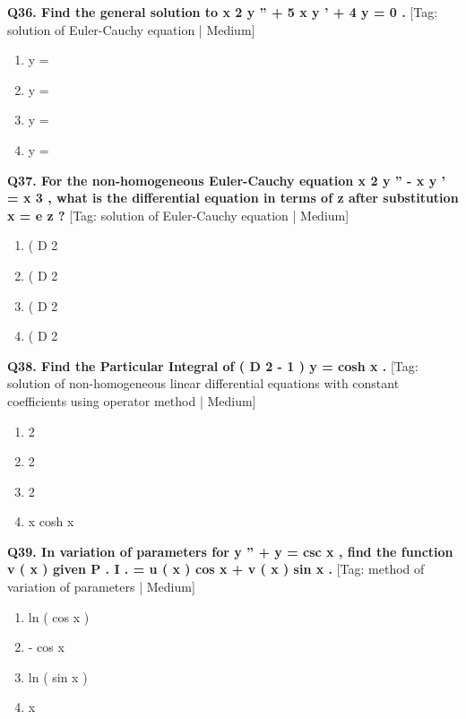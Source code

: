 \noindent\textbf{Q36. Find the general solution to x 2 y '' + 5 x y ' + 4 y = 0 .} \hfill [Tag: solution of Euler-Cauchy equation | Medium]
\begin{enumerate}[label=(\alph*),topsep=2pt,itemsep=1pt,partopsep=0pt,parsep=0pt]
    \item {{y =}}
    \item {{y =}}
    \item {{y =}}
    \item {{y =}}
\end{enumerate}
\vspace{2mm}

\noindent\textbf{Q37. For the non-homogeneous Euler-Cauchy equation x 2 y '' - x y ' = x 3 , what is the differential equation in terms of z after substitution x = e z ?} \hfill [Tag: solution of Euler-Cauchy equation | Medium]
\begin{enumerate}[label=(\alph*),topsep=2pt,itemsep=1pt,partopsep=0pt,parsep=0pt]
    \item {{( D 2}}
    \item {{( D 2}}
    \item {{( D 2}}
    \item {{( D 2}}
\end{enumerate}
\vspace{2mm}

\noindent\textbf{Q38. Find the Particular Integral of ( D 2 - 1 ) y = cosh x .} \hfill [Tag: solution of non-homogeneous linear differential equations with constant coefficients using operator method | Medium]
\begin{enumerate}[label=(\alph*),topsep=2pt,itemsep=1pt,partopsep=0pt,parsep=0pt]
    \item {{2}}
    \item {{2}}
    \item {{2}}
    \item {{x cosh x}}
\end{enumerate}
\vspace{2mm}

\noindent\textbf{Q39. In variation of parameters for y '' + y = csc x , find the function v ( x ) given P . I . = u ( x ) cos x + v ( x ) sin x .} \hfill [Tag: method of variation of parameters | Medium]
\begin{enumerate}[label=(\alph*),topsep=2pt,itemsep=1pt,partopsep=0pt,parsep=0pt]
    \item {{ln ( cos x )}}
    \item {{- cos x}}
    \item {{ln ( sin x )}}
    \item {{x}}
\end{enumerate}
\vspace{2mm}

